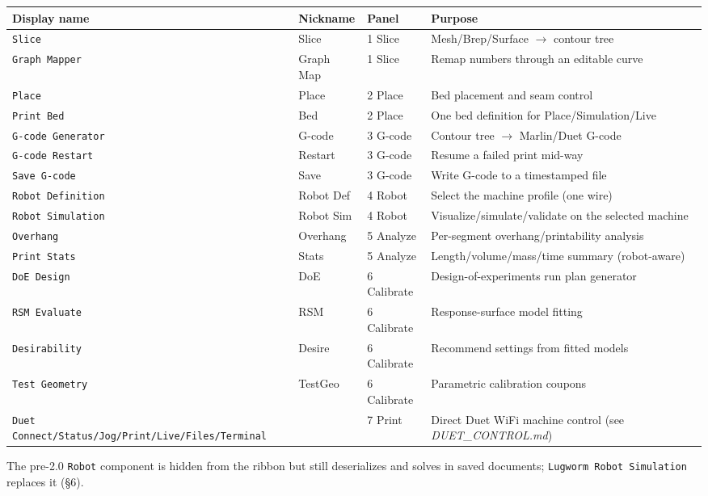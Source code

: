 \documentclass[11pt]{article}
\newcommand{\param}[1]{\texttt{#1}}
\begin{document}
\begin{longtable}{@{}p{3.9cm}p{1.8cm}p{2.0cm}p{6.9cm}@{}}
\toprule
\textbf{Display name} & \textbf{Nickname} & \textbf{Panel} & \textbf{Purpose} \\
\midrule
\endhead
\param{Slice} & Slice & 1 Slice & Mesh/Brep/Surface $\rightarrow$ contour tree \\
\param{Graph Mapper} & Graph Map & 1 Slice & Remap numbers through an editable curve \\
\param{Place} & Place & 2 Place & Bed placement and seam control \\
\param{Print Bed} & Bed & 2 Place & One bed definition for Place/Simulation/Live \\
\param{G-code Generator} & G-code & 3 G-code & Contour tree $\rightarrow$ Marlin/Duet G-code \\
\param{G-code Restart} & Restart & 3 G-code & Resume a failed print mid-way \\
\param{Save G-code} & Save & 3 G-code & Write G-code to a timestamped file \\
\param{Robot Definition} & Robot Def & 4 Robot & Select the machine profile (one wire) \\
\param{Robot Simulation} & Robot Sim & 4 Robot & Visualize/simulate/validate on the selected machine \\
\param{Overhang} & Overhang & 5 Analyze & Per-segment overhang/printability analysis \\
\param{Print Stats} & Stats & 5 Analyze & Length/volume/mass/time summary (robot-aware) \\
\param{DoE Design} & DoE & 6 Calibrate & Design-of-experiments run plan generator \\
\param{RSM Evaluate} & RSM & 6 Calibrate & Response-surface model fitting \\
\param{Desirability} & Desire & 6 Calibrate & Recommend settings from fitted models \\
\param{Test Geometry} & TestGeo & 6 Calibrate & Parametric calibration coupons \\
\param{Duet Connect/Status/Jog/Print/Live/Files/Terminal} & & 7 Print & Direct Duet WiFi machine control (see \emph{DUET\_CONTROL.md}) \\
\bottomrule
\end{longtable}

The pre-2.0 \param{Robot} component is hidden from the ribbon
but still deserializes and solves in saved documents; \param{Lugworm
Robot Simulation} replaces it (\S 6).
\end{document}
